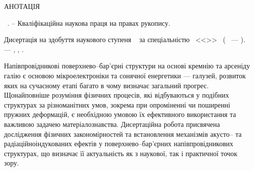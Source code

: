 \noindent
АНОТАЦІЯ						

\vspace{0.7cm}
\noindent
\thesisAuthorFIO~\thesisTitle. -- Кваліфікаційна наукова праця на правах рукопису.

\vspace{0.7cm}
\noindent
Дисертація на здобуття наукового ступеня \thesisDegree~
за спеціальністю \thesisSpecialtyNumber~<<\thesisSpecialtyTitle>>~
(\thesisKnowledgeNumber~ --- \thesisKnowledgeTitle). --- \thesisOrganization, \thesisCity, \thesisYear.

\vspace{0.7cm}

Напівпровідникові поверхнево--бар'єрні структури на основі кремнію та арсеніду галію є основою мікроелектроніки та сонячної енергетики --- галузей, розвиток яких на сучасному етапі багато в чому визначає загальний прогрес.
Щонайповніше розуміння фізичних процесів, які відбуваються у подібних структурах за різноманітних умов, зокрема при опроміненні чи поширенні пружних деформацій, є необхідною умовою їх ефективного використання та важливою задачею матеріалознавства.
Дисертаційна робота присвячена дослідження фізичних  закономірностей  та встановлення механізмів акусто-- та радіаційноіндукованих ефектів у поверхнево--бар'єрних напівпровідникових структурах, що визначає її  актуальність як з наукової, так і практичної точок зору.


